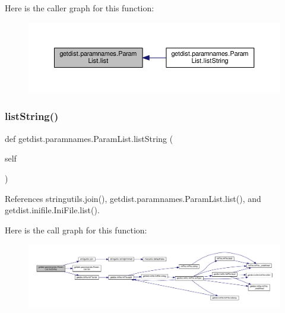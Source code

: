 Here is the caller graph for this function\+:
\nopagebreak
\begin{figure}[H]
\begin{center}
\leavevmode
\includegraphics[width=350pt]{classgetdist_1_1paramnames_1_1ParamList_ab27dfd8987f2ed7d1de27750b6eef094_icgraph}
\end{center}
\end{figure}
\mbox{\label{classgetdist_1_1paramnames_1_1ParamList_a591bf32d142f7b4f26594d509ad639a4}} 
\subsubsection{\texorpdfstring{list\+String()}{listString()}}
{\footnotesize\ttfamily def getdist.\+paramnames.\+Param\+List.\+list\+String (\begin{DoxyParamCaption}\item[{}]{self }\end{DoxyParamCaption})}



References stringutils.\+join(), getdist.\+paramnames.\+Param\+List.\+list(), and getdist.\+inifile.\+Ini\+File.\+list().

Here is the call graph for this function\+:
\nopagebreak
\begin{figure}[H]
\begin{center}
\leavevmode
\includegraphics[width=350pt]{classgetdist_1_1paramnames_1_1ParamList_a591bf32d142f7b4f26594d509ad639a4_cgraph}
\end{center}
\end{figure}
\mbox{\label{classgetdist_1_1paramnames_1_1ParamList_ad65897f1aba22e11c87438a840db6683}} 
